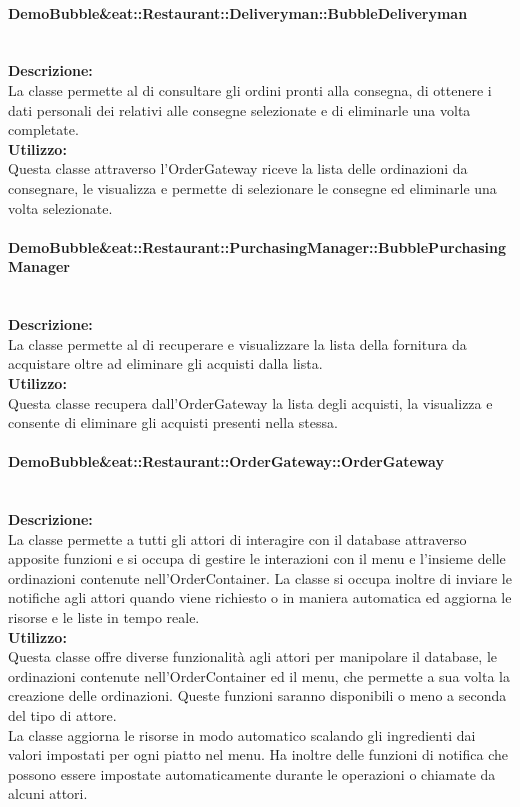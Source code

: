 \paragraph{Demo\-Bubble\&eat\-::Restaurant\-::Deliveryman\-::Bubble\-Deliveryman}\label{eat-deliveryman}\mbox{}\\
\textbf{Descrizione:}\\
La classe permette al \Deliveryman{} di consultare gli ordini pronti alla consegna, di ottenere i dati personali dei \Customer[2]{} relativi alle consegne selezionate e di eliminarle una volta completate.\\
\textbf{Utilizzo:}\\
Questa classe attraverso l'Order\-Gateway riceve la lista delle ordinazioni da consegnare, le visualizza e permette di selezionare le consegne ed eliminarle una volta selezionate.

\paragraph{Demo\-Bubble\&eat\-::Restaurant\-::PurchasingManager\-::Bubble\-Purcha\-sing\-Manager}\label{eat-purchasing}\mbox{}\\
\textbf{Descrizione:}\\
La classe permette al \Purchasingmanager{} di recuperare e visualizzare la lista della fornitura da acquistare oltre ad eliminare gli acquisti dalla lista.\\
\textbf{Utilizzo:}\\
Questa classe recupera dall'Order\-Gateway la lista degli acquisti, la visualizza e consente di eliminare gli acquisti presenti nella stessa.

\paragraph{Demo\-Bubble\&eat\-::Restaurant\-::Order\-Gateway\-::Order\-Gateway}\label{eat-gateway}\mbox{}\\
\textbf{Descrizione:}\\
La classe permette a tutti gli attori di interagire con il database attraverso apposite funzioni e si occupa di gestire le interazioni con il menu e l'insieme delle ordinazioni contenute nell'OrderContainer. La classe si occupa inoltre di inviare le notifiche agli attori quando viene richiesto o in maniera automatica ed aggiorna le risorse e le liste in tempo reale.\\
\textbf{Utilizzo:}\\
Questa classe offre diverse funzionalità agli attori per manipolare il database, le ordinazioni contenute nell'OrderContainer ed il menu, che permette a sua volta la creazione delle ordinazioni. Queste funzioni saranno disponibili o meno a seconda del tipo di attore.\\
La classe aggiorna le risorse in modo automatico scalando gli ingredienti dai valori impostati per ogni piatto nel menu. Ha inoltre delle funzioni di notifica che possono essere impostate automaticamente durante le operazioni o chiamate da alcuni attori.

